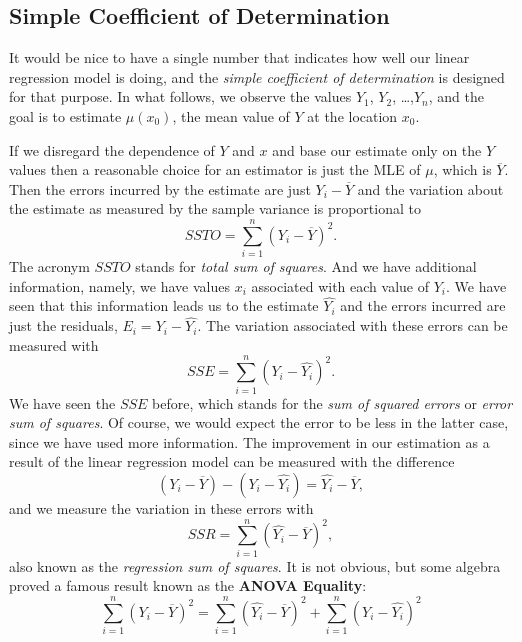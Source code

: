 \documentclass[captions=tableheading]{scrbook}
\begin{document}
\subsection{Simple Coefficient of Determination}
\label{sec-11-3-2}


It would be nice to have a single number that indicates how well our linear regression model is doing, and the \emph{simple coefficient of determination} is designed for that purpose. In what follows, we observe the values \(Y_{1}\), \(Y_{2}\), \ldots{},\(Y_{n}\), and the goal is to estimate \(\mu(x_{0})\), the mean value of \(Y\) at the location \(x_{0}\). 

If we disregard the dependence of \(Y\) and \(x\) and base our estimate only on the \(Y\) values then a reasonable choice for an estimator is just the MLE of \(\mu\), which is \(\overline{Y}\). Then the errors incurred by the estimate are just \(Y_{i}-\overline{Y}\) and the variation about the estimate as measured by the sample variance is proportional to
\begin{equation}
SSTO=\sum_{i=1}^{n}(Y_{i}-\overline{Y})^{2}.
\end{equation}
The acronym \(SSTO\) stands for \emph{total sum of squares}.  And we have additional information, namely, we have values \(x_{i}\) associated with each value of \(Y_{i}\). We have seen that this information leads us to the estimate \(\hat{Y_{i}}\) and the errors incurred are just the residuals, \(E_{i}=Y_{i}-\hat{Y_{i}}\). The variation associated with these errors can be measured with 
\begin{equation}
SSE=\sum_{i=1}^{n}(Y_{i}-\hat{Y_{i}})^{2}.
\end{equation}
We have seen the \(SSE\) before, which stands for the \emph{sum of squared errors} or \emph{error sum of squares}. Of course, we would expect the error to be less in the latter case, since we have used more information. The improvement in our estimation as a result of the linear regression model can be measured with the difference
\[
(Y_{i}-\overline{Y})-(Y_{i}-\hat{Y_{i}})=\hat{Y_{i}}-\overline{Y},
\]
and we measure the variation in these errors with
\begin{equation}
SSR=\sum_{i=1}^{n}(\hat{Y_{i}}-\overline{Y})^{2},
\end{equation}
also known as the \emph{regression sum of squares}. It is not obvious, but some algebra proved a famous result known as the \textbf{ANOVA Equality}:
\begin{equation}
\sum_{i=1}^{n}(Y_{i}-\overline{Y})^{2}=\sum_{i=1}^{n}(\hat{Y_{i}}-\overline{Y})^{2}+\sum_{i=1}^{n}(Y_{i}-\hat{Y_{i}})^{2}\label{eq:anovaeq}
\end{equation}
\end{document}

